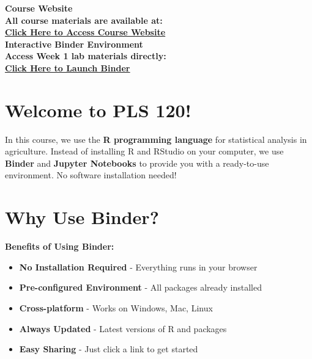 \documentclass[11pt,a4paper]{article}
\begin{document}
\begin{tcolorbox}[colback=ucdgold!20, colframe=ucdblue, boxrule=2pt, arc=5pt, title={\textbf{\Large Essential Course Resources}}]
\centering
\textbf{\Large Course Website}\\[0.5cm]
\textcolor{ucdblue}{\textbf{All course materials are available at:}}\\[0.3cm]
\href{https://mohammadrezanarimaniucdavis.github.io/PLS120-Statistics-Lab-Materials/}{\textbf{\Large \textcolor{ucdblue}{\underline{Click Here to Access Course Website}}}}\\[0.8cm]

\textbf{\Large Interactive Binder Environment}\\[0.5cm]
\textcolor{ucdblue}{\textbf{Access Week 1 lab materials directly:}}\\[0.3cm]
\href{https://mybinder.org/v2/gh/MohammadrezaNarimaniUCDavis/PLS120-Statistics-Lab-Materials/binder-week1}{\textbf{\Large \textcolor{ucdblue}{\underline{Click Here to Launch Binder}}}}
\end{tcolorbox}

\section{Welcome to PLS 120!}

In this course, we use the \textbf{R programming language} for statistical analysis in agriculture. Instead of installing R and RStudio on your computer, we use \textbf{Binder} and \textbf{Jupyter Notebooks} to provide you with a ready-to-use environment. No software installation needed!

\section{Why Use Binder?}

\begin{infobox}
\textbf{Benefits of Using Binder:}
\begin{itemize}[leftmargin=*]
    \item \textbf{No Installation Required} - Everything runs in your browser
    \item \textbf{Pre-configured Environment} - All packages already installed
    \item \textbf{Cross-platform} - Works on Windows, Mac, Linux
    \item \textbf{Always Updated} - Latest versions of R and packages
    \item \textbf{Easy Sharing} - Just click a link to get started
\end{itemize}
\end{infobox}
\end{document}
